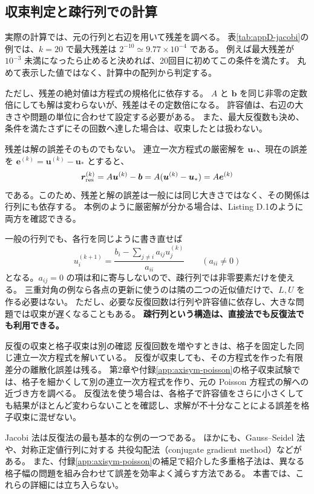 \subsection{収束判定と疎行列での計算}

実際の計算では、元の行列と右辺を用いて残差を調べる。
表\ref{tab:appD-jacobi}の例では、$k=20$ で最大残差は $2^{-10}\simeq9.77\times10^{-4}$ である。
例えば最大残差が $10^{-3}$ 未満になったら止めると決めれば、20回目に初めてこの条件を満たす。
丸めて表示した値ではなく、計算中の配列から判定する。

ただし、残差の絶対値は方程式の規格化に依存する。
$A$ と $\boldsymbol b$ を同じ非零の定数倍にしても解は変わらないが、残差はその定数倍になる。
許容値は、右辺の大きさや問題の単位に合わせて設定する必要がある。
また、最大反復数も決め、条件を満たさずにその回数へ達した場合は、収束したとは扱わない。

残差は解の誤差そのものでもない。
連立一次方程式の厳密解を $\boldsymbol u_\ast$、現在の誤差を $\boldsymbol e^{(k)}=\boldsymbol u^{(k)}-\boldsymbol u_\ast$ とすると、
\begin{equation}
 \boldsymbol r_{\rm res}^{(k)}
 =A\boldsymbol u^{(k)}-\boldsymbol b
 =A(\boldsymbol u^{(k)}-\boldsymbol u_\ast)
 =A\boldsymbol e^{(k)}
\label{eq:appD-residual-error}
\end{equation}
である。このため、残差と解の誤差は一般には同じ大きさではなく、その関係は行列にも依存する\cite{kouya2021}。
本例のように厳密解が分かる場合は、Listing D.1のように両方を確認できる。

一般の行列でも、各行を同じように書き直せば
\begin{equation}
 u_i^{(k+1)}
 =\frac{b_i-\displaystyle\sum_{j\ne i}a_{ij}u_j^{(k)}}{a_{ii}}
 \qquad(a_{ii}\ne0)
\label{eq:appD-jacobi-general}
\end{equation}
となる。$a_{ij}=0$ の項は和に寄与しないので、疎行列では非零要素だけを使える。
三重対角の例なら各点の更新に使うのは隣の二つの近似値だけで、$L,U$ を作る必要はない。
ただし、必要な反復回数は行列や許容値に依存し、大きな問題では収束が遅くなることもある。
\textbf{疎行列という構造は、直接法でも反復法でも利用できる。}

\begin{cautionblock}{反復の収束と格子収束は別の確認}
反復回数を増やすときは、格子を固定した同じ連立一次方程式を解いている。
反復が収束しても、その方程式を作った有限差分の離散化誤差は残る。
第2章や付録\ref{app:axisym-poisson}の格子収束試験では、格子を細かくして別の連立一次方程式を作り、元の Poisson 方程式の解への近づき方を調べる。
反復法を使う場合は、各格子で許容値をさらに小さくしても結果がほとんど変わらないことを確認し、求解が不十分なことによる誤差を格子収束に混ぜない。
\end{cautionblock}

Jacobi 法は反復法の最も基本的な例の一つである。
ほかにも、Gauss--Seidel 法や、対称正定値行列に対する
共役勾配法（conjugate gradient method）などがある。
また、付録\ref{app:axisym-poisson}の補足で紹介した多重格子法は、異なる格子幅の問題を組み合わせて誤差を効率よく減らす方法である。
本書では、これらの詳細には立ち入らない。

